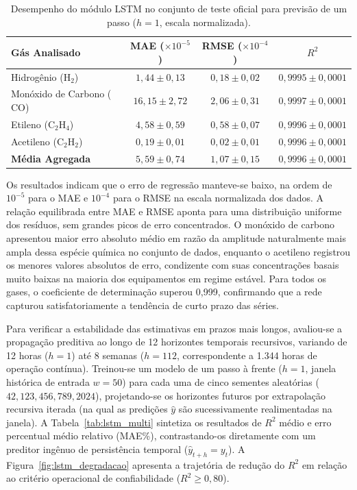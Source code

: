 \begin{table}[H]
\centering
\caption{Desempenho do módulo LSTM no conjunto de teste oficial para previsão de um passo ($h = 1$, escala normalizada).}
\label{tab:lstm_h1}
\begin{tabular}{lccc}
\hline
\textbf{Gás Analisado} & \textbf{MAE ($\times 10^{-5}$)} & \textbf{RMSE ($\times 10^{-4}$)} & \textbf{$R^2$} \\ \hline
Hidrogênio ($\text{H}_2$) & $1,44 \pm 0,13$ & $0,18 \pm 0,02$ & $0,9995 \pm 0,0001$ \\
Monóxido de Carbono ($\text{CO}$) & $16,15 \pm 2,72$ & $2,06 \pm 0,31$ & $0,9997 \pm 0,0001$ \\
Etileno ($\text{C}_2\text{H}_4$) & $4,58 \pm 0,59$ & $0,58 \pm 0,07$ & $0,9996 \pm 0,0001$ \\
Acetileno ($\text{C}_2\text{H}_2$) & $0,19 \pm 0,01$ & $0,02 \pm 0,01$ & $0,9996 \pm 0,0001$ \\ \hline
\textbf{Média Agregada} & $5,59 \pm 0,74$ & $1,07 \pm 0,15$ & $0,9996 \pm 0,0001$ \\ \hline
\end{tabular}
\end{table}

Os resultados indicam que o erro de regressão manteve-se baixo, na ordem de $10^{-5}$ para o MAE e $10^{-4}$ para o RMSE na escala normalizada dos dados. A relação equilibrada entre MAE e RMSE aponta para uma distribuição uniforme dos resíduos, sem grandes picos de erro concentrados. O monóxido de carbono apresentou maior erro absoluto médio em razão da amplitude naturalmente mais ampla dessa espécie química no conjunto de dados, enquanto o acetileno registrou os menores valores absolutos de erro, condizente com suas concentrações basais muito baixas na maioria dos equipamentos em regime estável. Para todos os gases, o coeficiente de determinação superou 0,999, confirmando que a rede capturou satisfatoriamente a tendência de curto prazo das séries.

Para verificar a estabilidade das estimativas em prazos mais longos, avaliou-se a propagação preditiva ao longo de 12 horizontes temporais recursivos, variando de 12 horas ($h = 1$) até 8 semanas ($h = 112$, correspondente a 1.344 horas de operação contínua). Treinou-se um modelo de um passo à frente ($h=1$, janela histórica de entrada $w = 50$) para cada uma de cinco sementes aleatórias ($42, 123, 456, 789, 2024$), projetando-se os horizontes futuros por extrapolação recursiva iterada (na qual as predições $\hat{y}$ são sucessivamente realimentadas na janela). A Tabela~\ref{tab:lstm_multi} sintetiza os resultados de $R^2$ médio e erro percentual médio relativo (MAE\%), contrastando-os diretamente com um preditor ingênuo de persistência temporal ($\hat{y}_{t+h} = y_t$). A Figura~\ref{fig:lstm_degradacao} apresenta a trajetória de redução do $R^2$ em relação ao critério operacional de confiabilidade ($R^2 \ge 0,80$).

